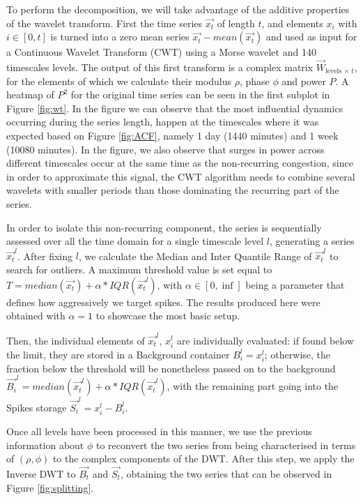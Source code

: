 \documentclass[a4paper, 10pt, conference]{ieeeconf}      %
\begin{document}
To perform the decomposition, we will take advantage of the additive properties of the wavelet transform. First the time series $\vec{x_t}$ of length $t$, and elements $x_i$ with $i \in [0,t]$ is turned into a zero mean series $\vec{x_t} - mean(\vec{x_t})$ and used as input for a Continuous Wavelet Transform (CWT) \cite{daubechies} \cite{mallat} using a Morse wavelet \cite{morse} and 140 timescales levels.
The output of this first transform is a complex matrix $\vec{W}_{\textrm{levels}\,\times\, t}$, for the elements of which we calculate their modulus $\rho$, phase $\phi$ and power $P$. 
A heatmap of $P^2$ for the original time series can be seen in the first subplot in Figure \ref{fig:wt}.
In the figure we can observe that the most influential dynamics occurring during the series length, happen at the timescales where it was expected based on Figure \ref{fig:ACF}, namely 1 day (1440 minutes) and 1 week (10080 minutes).
In the figure, we also observe that surges in power across different timescales occur at the same time as the non-recurring congestion, since in order to approximate this signal, the CWT algorithm needs to combine several wavelets with smaller periods than those dominating the recurring part of the series.

In order to isolate this non-recurring component, the series is sequentially assessed over all the time domain for a single timescale level $l$, generating a series $\vec{x_{t}}^l$.
After fixing $l$, we calculate the Median and Inter Quantile Range of $\vec{x_{t}}^l$ to search for outliers.
A maximum threshold value is set equal to $T = median(\vec{x_t}) + \alpha * IQR(\vec{x_{t}}^l)$, with $\alpha \in [0,\inf]$ being a parameter that defines how aggressively we target spikes. 
The results produced here were obtained with $\alpha=1$ to showcase the most basic setup.

Then, the individual elements of $\vec{x_{t}}^l$, $x_{i}^l$ are individually evaluated: if found below the limit, they are stored in a Background container $B_i^l = x_{i}^l$; otherwise, the fraction below the threshold will be nonetheless passed on to the background $\vec{B_i}^l = median(\vec{x_{t}}^l) + \alpha * IQR(\vec{x_{t}}^l)$, with the remaining part going into the Spikes storage $\vec{S_i}^l = x_{i}^l - B_{i}^l$.

Once all levels have been processed in this manner, we use the previous information about $\phi$ to reconvert the two series from being characterised in terms of $(\rho, \phi)$ to the complex components of the DWT.
After this step, we apply the Inverse DWT to $\vec{B_t}$ and $\vec{S_t}$, obtaining the two series that can be observed in Figure \ref{fig:splitting}.
\end{document}
